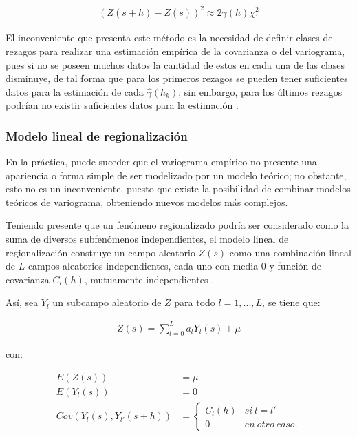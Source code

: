 \documentclass[
]{book}
\begin{document}
\begin{align*}
  (Z(s+h)-Z(s))^2\approx 2\gamma(h)\chi_1^2   
\end{align*}

El inconveniente que presenta este método es la necesidad de definir clases de rezagos para realizar una estimación empírica de la covarianza o del variograma, pues si no se poseen muchos datos la cantidad de estos en cada una de las clases disminuye, de tal forma que para los primeros rezagos se pueden tener suficientes datos para la estimación de cada \(\hat{\gamma}(h_k)\); sin embargo, para los últimos rezagos podrían no existir suficientes datos para la estimación \citep{marta}.

\hypertarget{modelo-lineal-de-regionalizaciuxf3n}{%
\subsubsection*{Modelo lineal de regionalización}\label{modelo-lineal-de-regionalizaciuxf3n}}

En la práctica, puede suceder que el variograma empírico no presente una apariencia o forma simple de ser modelizado por un modelo teórico; no obstante, esto no es un inconveniente, puesto que existe la posibilidad de combinar modelos teóricos de variograma, obteniendo nuevos modelos más complejos.

Teniendo presente que un fenómeno regionalizado podría ser considerado como la suma de diversos subfenómenos independientes, el modelo lineal de regionalización construye un campo aleatorio \(Z(s)\) como una combinación lineal de \(L\) campos aleatorios independientes, cada uno con media 0 y función de covarianza \(C_l(h)\), mutuamente independientes \citep{marta}.

Así, sea \(Y_l\) un subcampo aleatorio de \(Z\) para todo \(l=1,...,L\), se tiene que:

\begin{align*}
  Z(s)=\sum_{l=0}^{L}a_lY_l(s)+\mu
\end{align*}

con:

\begin{align*}
    E(Z(s))&=\mu\\
    E(Y_l(s))&=0\\
    Cov(Y_l(s),Y_{l'}(s+h))&= \left \{ \begin{matrix} C_l(h) & si \ l=l'
\\ 0 & en\ otro\ caso.
\end{matrix}\right.  
\end{align*}
\end{document}
